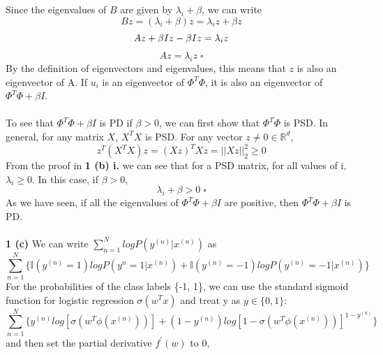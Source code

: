 \documentclass[12 pt]{article}        	%
\begin{document}
Since the eigenvalues of $ B $ are given by $ \lambda_i + \beta $, we can write
\begin{displaymath}
  Bz = (\lambda_i + \beta) z = \lambda_i z + \beta z
\end{displaymath}
\begin{displaymath}
  A z + \beta I z - \beta I z = \lambda_i z  \\
\end{displaymath}
\begin{displaymath}
  A z = \lambda_i z \; \square
\end{displaymath}
By the definition of eigenvectors and eigenvalues, this means that $ z $ is also an eigenvector of A. 
If $ u_i $ is an eigenvector of $ \Phi^T \Phi $, it is also an eigenvector of $ \Phi^T \Phi + \beta I $. \\ \\
To see that $ \Phi^T \Phi + \beta I $ is PD if $ \beta > 0 $, 
we can first show that $ \Phi^T \Phi $ is PSD. In general, for any matrix $ X $, $ X^T X $ is PSD. 
For any vector $ z \neq 0 \in \mathbb{R}^d $, 
\begin{displaymath}
  z^T (X^T X) z = (X z)^T X z = || X z ||_2^2 \geq 0
\end{displaymath}
From the proof in \textbf{1 (b) i.} we can see that for a PSD matrix, for all values of i, $ \lambda_i \geq 0 $. In this case, if $ \beta > 0 $,
\begin{displaymath}
  \lambda_i + \beta > 0 \; \square
\end{displaymath}
As we have seen, if all the eigenvalues of $ \Phi^T \Phi + \beta I $ are positive, then $ \Phi^T \Phi + \beta I $ is PD. \\ \\
\textbf{1 (c)} We can write $ \sum_{n=1}^{N} log P(y^{(n)} | x^{(n)}) $ as
\begin{displaymath}
  \sum_{n=1}^{N} \{ \mathbb{I}(y^{(n)} = 1) log P(y^{n} = 1 | x^{(n)}) + \mathbb{I}(y^{(n)} = -1) log P(y^{(n)} = -1 | x^{(n)}) \}
\end{displaymath}
For the probabilities of the class labels \{-1, 1\}, 
we can use the standard sigmoid function for logistic regression $ \sigma(w^T x) $
and treat y as $ y \in \{0, 1\} $:
\begin{displaymath}
  \sum_{n=1}^{N} \{
    y^{(n)} log [ \sigma (w^T \phi(x^{(n)}))] + (1 - y^{(n)}) log [1 - \sigma (w^T \phi (x^{(n)}))]^{1 - y^{(n)}} 
  \}
\end{displaymath}
and then set the partial derivative $ f^{\prime}(w) $ to 0,
\end{document}
